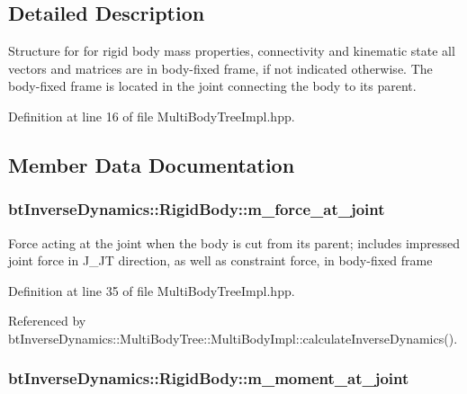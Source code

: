 \subsection{Detailed Description}
Structure for for rigid body mass properties, connectivity and kinematic state all vectors and matrices are in body-fixed frame, if not indicated otherwise. The body-fixed frame is located in the joint connecting the body to its parent. 

Definition at line 16 of file MultiBodyTreeImpl.hpp.

\subsection{Member Data Documentation}
\hypertarget{structbt_inverse_dynamics_1_1_rigid_body_00b16b69c8a91774162c934ca8ec1e2c}{
\subsubsection[m\_\-force\_\-at\_\-joint]{ {\bf btInverseDynamics::RigidBody::m\_\-force\_\-at\_\-joint}}}
\label{structbt_inverse_dynamics_1_1_rigid_body_00b16b69c8a91774162c934ca8ec1e2c}


Force acting at the joint when the body is cut from its parent; includes impressed joint force in J\_\-JT direction, as well as constraint force, in body-fixed frame 

Definition at line 35 of file MultiBodyTreeImpl.hpp.

Referenced by btInverseDynamics::MultiBodyTree::MultiBodyImpl::calculateInverseDynamics().\hypertarget{structbt_inverse_dynamics_1_1_rigid_body_e72019499bdedb8dc12131a48b3a243c}{
\subsubsection[m\_\-moment\_\-at\_\-joint]{ {\bf btInverseDynamics::RigidBody::m\_\-moment\_\-at\_\-joint}}}
\label{structbt_inverse_dynamics_1_1_rigid_body_e72019499bdedb8dc12131a48b3a243c}


